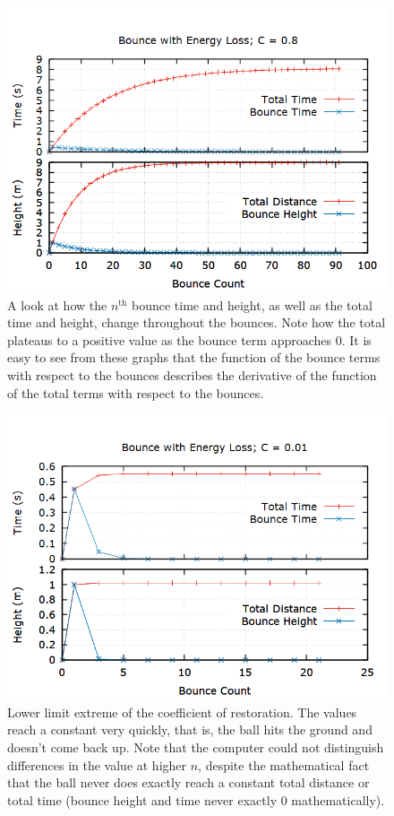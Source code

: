 \documentclass[aps,prl,twocolumn,superscriptaddress]{revtex4-1}
\begin{document}
\begin{figure}[htbp]
\begin{center}
 		\includegraphics[scale=0.27]{08.png} 
  		\caption{A look at how the $n^{\text{th}}$ bounce time and height, as well as the total time and height, change throughout the bounces. Note how the total plateaus to a positive value as the bounce term approaches 0. It is easy to see from these graphs that the function of the bounce terms with respect to the bounces describes the derivative of the function of the total terms with respect to the bounces.}
  		\label{gr:gen}
 	\end{center}
\end{figure}

\begin{figure}[htbp]
 	\begin{center}
 		\includegraphics[scale=0.27]{001.png} 
  		\caption{Lower limit extreme of the coefficient of restoration. The values reach a constant very quickly, that is, the ball hits the ground and doesn't come back up. Note that the computer could not distinguish differences in the value at higher $n$, despite the mathematical fact that the ball never does exactly reach a constant total distance or total time (bounce height and time never exactly 0 mathematically).}
  		\label{gr:0.01}
 	\end{center}
\end{figure}
\end{document}
